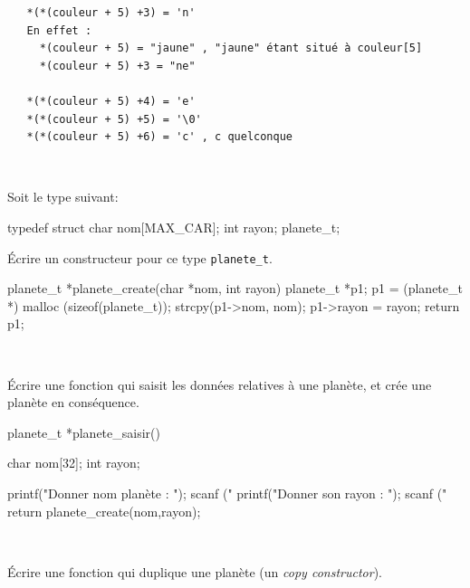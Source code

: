 \documentclass[10pt]{article}\usepackage[nu,correction]{esial}
\begin{document}
\begin{Reponse}
\begin{verbatim} 
   *(*(couleur + 5) +3) = 'n' 
   En effet : 
     *(couleur + 5) = "jaune" , "jaune" étant situé à couleur[5] 
     *(couleur + 5) +3 = "ne"

   *(*(couleur + 5) +4) = 'e' 
   *(*(couleur + 5) +5) = '\0' 
   *(*(couleur + 5) +6) = 'c' , c quelconque 
\end{verbatim}
~
\end{Reponse}




\bigskip\bigskip{}

Soit le type suivant:


\medskip

\begin{boxedverbatim}
  typedef struct {
    char nom[MAX_CAR];
    int  rayon;  
  } planete_t;
\end{boxedverbatim}


\Question Écrire un constructeur pour ce type \texttt{planete\_t}.

\begin{Reponse}
  \begin{boxedverbatim} 
planete_t *planete_create(char *nom, int rayon) {
    planete\_t *p1;
    p1 = (planete_t *) malloc (sizeof(planete_t));
    strcpy(p1->nom, nom);
    p1->rayon = rayon;
    return p1;
}  \end{boxedverbatim}
~
\end{Reponse}
	  
\Question Écrire une fonction qui saisit les données relatives à une
planète, et crée une planète en conséquence.

\begin{Reponse}
  \begin{boxedverbatim} 
planete_t *planete_saisir(){
  char nom[32];
  int rayon;

  printf("Donner nom planète : ");
  scanf ("%
  printf("Donner son rayon : ");
  scanf ("%
  return planete_create(nom,rayon);
}  \end{boxedverbatim}
~
\end{Reponse}

\Question Écrire une fonction qui duplique une planète (un
\textit{copy constructor}). 
\end{document}

